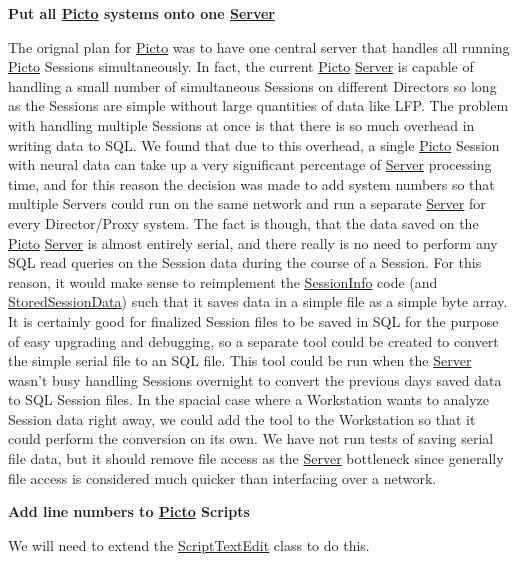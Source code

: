 {\bfseries Put all \hyperlink{namespace_picto}{Picto} systems onto one \hyperlink{class_server}{Server}}\par
 The orignal plan for \hyperlink{namespace_picto}{Picto} was to have one central server that handles all running \hyperlink{namespace_picto}{Picto} Sessions simultaneously. In fact, the current \hyperlink{namespace_picto}{Picto} \hyperlink{class_server}{Server} is capable of handling a small number of simultaneous Sessions on different Directors so long as the Sessions are simple without large quantities of data like L\-F\-P. The problem with handling multiple Sessions at once is that there is so much overhead in writing data to S\-Q\-L. We found that due to this overhead, a single \hyperlink{namespace_picto}{Picto} Session with neural data can take up a very significant percentage of \hyperlink{class_server}{Server} processing time, and for this reason the decision was made to add system numbers so that multiple Servers could run on the same network and run a separate \hyperlink{class_server}{Server} for every Director/\-Proxy system. The fact is though, that the data saved on the \hyperlink{namespace_picto}{Picto} \hyperlink{class_server}{Server} is almost entirely serial, and there really is no need to perform any S\-Q\-L read queries on the Session data during the course of a Session. For this reason, it would make sense to reimplement the \hyperlink{class_session_info}{Session\-Info} code (and \hyperlink{class_stored_session_data}{Stored\-Session\-Data}) such that it saves data in a simple file as a simple byte array. It is certainly good for finalized Session files to be saved in S\-Q\-L for the purpose of easy upgrading and debugging, so a separate tool could be created to convert the simple serial file to an S\-Q\-L file. This tool could be run when the \hyperlink{class_server}{Server} wasn't busy handling Sessions overnight to convert the previous days saved data to S\-Q\-L Session files. In the spacial case where a Workstation wants to analyze Session data right away, we could add the tool to the Workstation so that it could perform the conversion on its own. We have not run tests of saving serial file data, but it should remove file access as the \hyperlink{class_server}{Server} bottleneck since generally file access is considered much quicker than interfacing over a network.

{\bfseries Add line numbers to \hyperlink{namespace_picto}{Picto} Scripts}\par
 We will need to extend the \hyperlink{class_script_text_edit}{Script\-Text\-Edit} class to do this.

